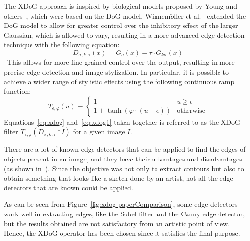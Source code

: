 \noindent The XDoG approach is inspired by biological models proposed by Young and others~\cite{GaussianDerivativeModel}, which were based on the DoG model. Winnem$\ddot o$ller et al.~\cite{RealTimeVideoAbstraction} extended the DoG model to allow for greater control over the inhibitory effect of the larger Gaussian, which is allowed to vary, resulting in a more advanced edge detection technique with the following equation:
\begin{equation}
    D_{\sigma, k,\tau}(x)=G_{\sigma}(x)-\tau \cdot G_{k\sigma}(x)
    \label{eq:xdog}
\end{equation}
 This allows for more fine-grained control over the output, resulting in more precise edge detection and image stylization. In particular, it is possible to achieve a wider range of stylistic effects using the following continuous ramp function:
 \begin{equation}
     T_{\epsilon, \varphi}(u) = 
     \begin{cases}
        1 & u \ge \epsilon \\
        1+ \tanh (\varphi \cdot (u-\epsilon)) & \mbox{otherwise}
    \end{cases}
\label{eq:xdog1}
 \end{equation}
Equations~\ref{eq:xdog} and~\ref{eq:xdog1} taken together is referred to as the XDoG filter $T_{\epsilon, \varphi}(D_{\sigma, k, \tau }*I)$ for a given image $I$. 

\noindent There are a lot of known edge detectors that can be applied to find the edges of objects present in an image, and they have their advantages and disadvantages (as shown in~\cite{xdog}). Since the objective was not only to extract contours but also to obtain something that looks like a sketch done by an artist, not all the edge detectors that are known could be applied. 

\noindent As can be seen from Figure~\ref{fig:xdog-paperComparison}, some edge detectors work well in extracting edges, like the Sobel filter and the Canny edge detector, but the results obtained are not satisfactory from an artistic point of view. Hence, the XDoG operator has been chosen since it satisfies the final purpose.

